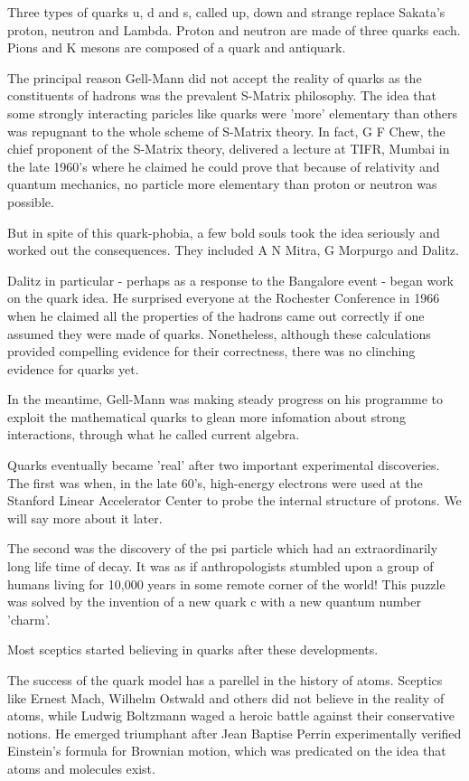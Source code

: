 Three types of quarks u, d and s, called up, down and strange replace
Sakata's proton, neutron and Lambda. Proton and neutron are made of
three quarks each. Pions and K mesons are composed of a quark and
antiquark.

The principal reason Gell-Mann did not accept the reality of quarks
as the constituents of hadrons was the prevalent S-Matrix philosophy.
The idea that some strongly interacting paricles like quarks were
'more' elementary than others was repugnant to the whole scheme of
S-Matrix theory. In fact, G F Chew, the chief proponent of the S-Matrix
theory, delivered a lecture at TIFR, Mumbai in the late 1960's
where he claimed he could prove that because of relativity and quantum
mechanics, no particle more elementary than proton or neutron was
possible.

But in spite of this quark-phobia, a few bold souls took the idea
seriously and worked out the consequences. They included A N Mitra,
G Morpurgo and Dalitz.

Dalitz in particular - perhaps as a response to the Bangalore event -
began work on the quark idea. He surprised everyone at the Rochester
Conference in 1966 when he claimed all the properties of the hadrons came
out correctly if one assumed they were made of quarks.
Nonetheless, although these calculations provided compelling evidence
for their correctness, there was no clinching evidence for quarks yet.

In the meantime, Gell-Mann was making steady progress on his programme to
exploit the mathematical quarks to glean more infomation about strong
interactions, through what he called current algebra.

Quarks eventually became 'real' after two important experimental discoveries.
The first was when, in the late 60's, high-energy electrons were used
at the Stanford Linear Accelerator Center to probe the internal
structure of protons. We will say more about it later.

The second was the discovery of the psi particle which had an extraordinarily
long life time of decay. It was as if anthropologists stumbled upon a
group of humans living for 10,000 years in some remote corner of the world!
This puzzle was solved by the invention of a new quark c with a new quantum
number 'charm'.

Most sceptics started believing in quarks after these developments.

The success of the quark model has a parellel in the history of atoms.
Sceptics like Ernest Mach, Wilhelm Ostwald and others did not believe
in the reality of atoms, while Ludwig Boltzmann waged a heroic battle
against their conservative notions. He emerged triumphant after Jean
Baptise Perrin experimentally verified Einstein's formula for Brownian
motion, which was predicated on the idea that atoms and molecules exist.

